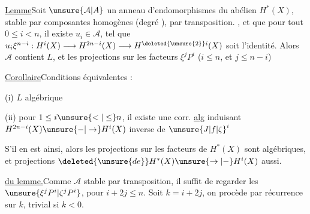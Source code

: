 \uline{Lemme}\quad Soit $\unsure{\mathcal{A}|A}$ un anneau d'endomorphismes
du  abélien $H^{*}(X)$, stable par composantes homogènes
(degré ), par transposition.  , et que pour
tout $0\leq i<n$, il existe $u_i\in\mathcal{A}$,  tel que
$u_i\xi^{n-i}:H^i(X)\longrightarrow H^{2n-i}(X)\longrightarrow H^{\deleted{\unsure{2}}i}(X)$ soit l'identité.
Alors $\mathcal{A}$ contient $L$,  et les projections
sur les facteurs  $\xi^j P^i$ ($i\leq n$, et
 $j\leq n-i$)

\uline{Corollaire}\quad Conditions équivalentes :

(i) $L$ algébrique

(ii) pour  $1\leq i\unsure{<|\leq}n$, il existe une corr. \uline{alg}
induisant $H^{2n-i}(X)\unsure{-|\to}H^i(X)$ inverse de $\unsure{J|f|\zeta}^i$

 S'il en est ainsi, alors les \deleted{\unsure{$\xi$}} projections
sur les facteurs  de $H^{*}(X)$
sont algébriques, et  projections $\deleted{\unsure{de}}H^{*}(X)\unsure{\to|-}H^i(X)$
aussi.

\uline{ du lemme.}\quad Comme $\mathcal{A}$ stable par
transposition, il suffit de regarder les $\unsure{\xi^jP^i|\zeta^jP^i}$,
pour $i+2j\leq n$. Soit $k=i+2j$, on procède
par récurrence sur $k$, trivial si $k<0$.

